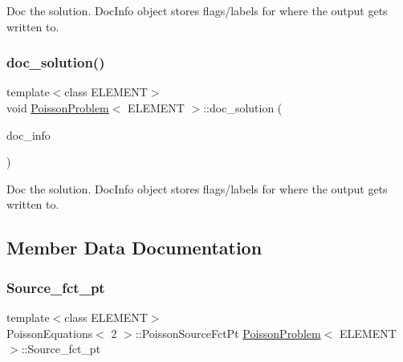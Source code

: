 Doc the solution. Doc\+Info object stores flags/labels for where the output gets written to. 

\mbox{\label{classPoissonProblem_aab6f503fa242f687bb8452527bb7688f}} 
\subsubsection{\texorpdfstring{doc\+\_\+solution()}{doc\_solution()}\hspace{0.1cm}{\footnotesize\ttfamily [3/3]}}
{\footnotesize\ttfamily template$<$class E\+L\+E\+M\+E\+NT$>$ \\
void \hyperlink{classPoissonProblem}{Poisson\+Problem}$<$ E\+L\+E\+M\+E\+NT $>$\+::doc\+\_\+solution (\begin{DoxyParamCaption}\item[{Doc\+Info \&}]{doc\+\_\+info }\end{DoxyParamCaption})}



Doc the solution. Doc\+Info object stores flags/labels for where the output gets written to. 



\subsection{Member Data Documentation}
\mbox{\label{classPoissonProblem_a2ba5bb705abab012b72bbd7f4016d5fe}} 
\subsubsection{\texorpdfstring{Source\+\_\+fct\+\_\+pt}{Source\_fct\_pt}}
{\footnotesize\ttfamily template$<$class E\+L\+E\+M\+E\+NT$>$ \\
Poisson\+Equations$<$ 2 $>$\+::Poisson\+Source\+Fct\+Pt \hyperlink{classPoissonProblem}{Poisson\+Problem}$<$ E\+L\+E\+M\+E\+NT $>$\+::Source\+\_\+fct\+\_\+pt\hspace{0.3cm}{\ttfamily [private]}}



